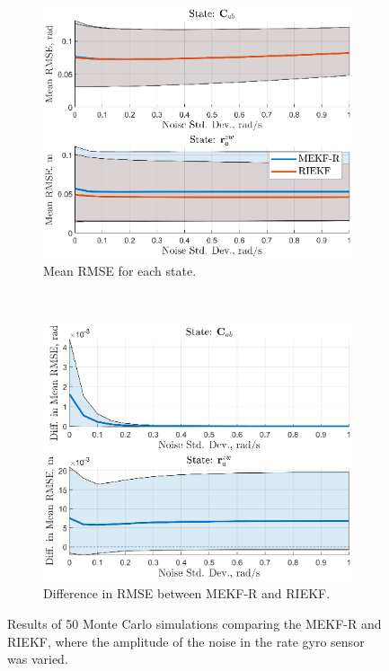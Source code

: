 \begin{figure}
	\centering
	\begin{subfigure}[b]{0.5\textwidth}
		\includegraphics[width=\textwidth]{figs/se3/noise_trials/comp_noise_rmse_state_Gyro_R.eps}
		\caption{Mean RMSE for each state. }
		\label{fig:comp_noise_gyro_R_rmse}
	\end{subfigure}
	~
	\begin{subfigure}[b]{0.5\textwidth}
		\includegraphics[width=\textwidth]{figs/se3/noise_trials/comp_noise_diff_state_Gyro_R.eps}
		\caption{Difference in RMSE between MEKF-R and RIEKF.}
		\label{fig:comp_noise_gyro_R_diff}
	\end{subfigure}
	\caption[Results comparing the MEKF-R and RIEKF varying rate gyro noise.]{Results of 50 Monte Carlo simulations comparing the MEKF-R and RIEKF, where the amplitude of the noise in the rate gyro sensor was varied. }
	\label{fig:comp_noise_gyro_R}
\end{figure}
